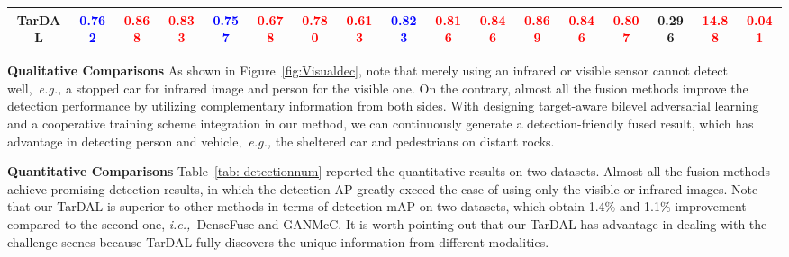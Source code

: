 \documentclass[10pt,twocolumn,letterpaper]{article}
\begin{document}
\begin{table*}[!htb]
\begin{tabular}{|c|cccccc|c|ccccc|c|ccc|}
		\footnotesize TarDAL&\footnotesize\textcolor{blue}{\textbf{0.762}}&\footnotesize \textcolor{red}{\textbf{0.868}}&\footnotesize \textcolor{red}{\textbf{0.833}}&\footnotesize  \textcolor{blue}{\textbf{0.757}} &\footnotesize \textcolor{red}{\textbf{0.678}}&\footnotesize \textcolor{red}{\textbf{0.780}}&\footnotesize \textcolor{red}{\textbf{0.613}}&\footnotesize \textcolor{blue}{\textbf{0.823}}&\footnotesize \textcolor{red}{\textbf{0.816}}&\footnotesize \textcolor{red}{\textbf{0.846}}&\footnotesize \textcolor{red}{\textbf{0.869}} &\footnotesize \textcolor{red}{\textbf{0.846}}&\footnotesize \textcolor{red}{\textbf{0.807}} &\footnotesize 0.296 &\footnotesize \textcolor{red}{\textbf{14.88}} &\footnotesize \textcolor{red}{\textbf{0.041}}\\
		\hline 
	\end{tabular}
	\caption{Quantitative results of object detection on the Multispectral and M$^3$FD datasets among all the image fusion method + detector (YOLOv5). The best result is in {\textcolor{red}{\textbf{red}}} whereas the second best one is in {\textcolor{blue}{\textbf{blue}}}.}
	\label{tab: detectionnum}
\end{table*}
\noindent\textbf{Qualitative Comparisons} 
As shown in Figure~\ref{fig:Visualdec}, note that merely using an infrared or visible sensor cannot detect well,~\emph{e.g.,} a stopped car for infrared image and person for the visible one. On the contrary, almost all the fusion methods improve the detection performance by utilizing complementary information from both sides. With designing target-aware bilevel adversarial learning and a cooperative training scheme integration in our method, we can continuously generate a detection-friendly fused result, which has advantage in detecting person and vehicle,~\emph{e.g.,} the sheltered car and pedestrians on distant rocks.

\noindent\textbf{Quantitative Comparisons} 
Table~\ref{tab: detectionnum} reported the quantitative results on two datasets. Almost all the fusion methods achieve promising detection results, in which the detection AP greatly exceed the case of using only the visible or infrared images. Note that our TarDAL is superior to other methods in terms of detection mAP on two datasets, which obtain 1.4$\%$ and 1.1$\%$ improvement compared to the second one, \emph{i.e.,}~DenseFuse and GANMcC. It is worth pointing out that our TarDAL has advantage in dealing with the challenge scenes because TarDAL fully discovers the unique information from different modalities.
\end{document}
